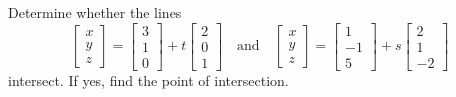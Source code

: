 \documentclass{ximera}
\begin{document}
\begin{example}\label{ex:lines-intersect}

  Determine whether the lines
  \begin{equation*}
    \begin{bmatrix} x \\ y \\ z \end{bmatrix}
    = \begin{bmatrix} 3 \\ 1 \\ 0 \end{bmatrix}
    + t \begin{bmatrix} 2 \\ 0 \\ 1 \end{bmatrix}
    \quad\mbox{and}\quad
    \begin{bmatrix} x \\ y \\ z \end{bmatrix}
    = \begin{bmatrix} 1 \\ -1 \\ 5 \end{bmatrix}
    + s \begin{bmatrix} 2 \\ 1 \\ -2 \end{bmatrix}
  \end{equation*}
  intersect. If yes, find the point of intersection.%
\end{example}
\end{document}

